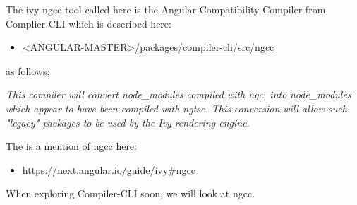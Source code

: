 

The ivy-ngcc tool called here is the Angular Compatibility Compiler from Complier-CLI
which is described here:

\begin{itemize}
  \item \href{https://github.com/angular/angular/tree/master/packages/compiler-cli/src/ngcc}
        {<ANGULAR-MASTER>/packages/compiler-cli/src/ngcc}
\end{itemize}

as follows:

\emph{This compiler will convert node\_modules compiled with ngc, into}
\emph{node\_modules which appear to have been compiled with ngtsc. This}
\emph{conversion will allow such "legacy" packages to be used by the Ivy}
\emph{rendering engine.}

The is a mention of ngcc here:

\begin{itemize}
  \item \url{https://next.angular.io/guide/ivy#ngcc}
\end{itemize}

When exploring Compiler-CLI soon, we will look at ngcc.
